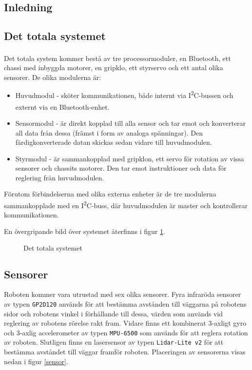 \documentclass[11pt]{article}
\begin{document}
\begin{flushleft}
\section{Inledning}
\lipsum

\subsection{Det totala systemet}
Det totala system kommer bestå av tre processormoduler, en Bluetooth\textsuperscript{\circledR}, ett chassi med inbyggda motorer, en gripklo, ett styrservo och ett antal olika sensorer. De olika modulerna är:
\begin{itemize}
	\item Huvudmodul - sköter kommunikationen, både internt via I\textsuperscript{2}C-bussen och externt via en Bluetooth\textsuperscript{\circledR}-enhet.
	\item Sensormodul - är direkt kopplad till alla sensor och tar emot och konverterar all data från dessa (främst i form av analoga spänningar). Den färdigkonverterade datan skickas sedan vidare till huvudmodulen.
	\item Styrmodul - är sammankopplad med gripklon, ett servo för rotation av vissa sensorer och chassits motorer. Den tar emot instruktioner och data för reglering från huvudmodulen.
\end{itemize}
Förutom förbindelserna med olika externa enheter är de tre modulerna sammankopplade med en I\textsuperscript{2}C-buss, där huvudmodulen är master och kontrollerar kommunikationen. 

En övergripande bild över systemet återfinns i figur \ref{overview}.

\begin{figure}[!htbp]
\centering
\noindent\resizebox{\linewidth}{!}{
	}
	\caption{Det totala systemet \label{overview}}	
\end{figure}

\FloatBarrier
\subsection{Sensorer}
Roboten kommer vara utrustad med sex olika sensorer. Fyra infraröda sensorer av typen \verb+GP2D120+ används för att bestämma avstånden till väggarna på robotens sidor och robotens vinkel i förhållande till dessa, värden som används vid reglering av robotens rörelse rakt fram. Vidare finns ett kombinerat 3-axligt gyro och 3-axlig accelerometer av typen \verb+MPU-6500+ som används för att reglera rotation av roboten. Slutligen finns en lasersensor av typen \verb+Lidar-Lite v2+ för att bestämma avståndet till väggar framför roboten. Placeringen av sensorerna visas nedan i figur \ref{sensor}.


\end{flushleft}
\end{document}
